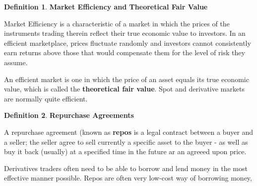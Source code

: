 \documentclass{book}
\theoremstyle{definition}
\newtheorem{definition}{Definition}[section]
\theoremstyle{remark}
\begin{document}
    \begin{definition}{\textbf{Market Efficiency and Theoretical Fair Value}}
        
        Market Efficiency is a characteristic of a market in which the prices of the instruments trading therein reflect their true economic value to investors. In an efficient marketplace, prices fluctuate randomly and investors cannot consistently earn returns above those that would compensate them for the level of risk they assume.
        
        An efficient market is one in which the price of an asset equals its true economic value, which is called the \textbf{theoretical fair value}. Spot and derivative markets are normally quite efficient. 
    \end{definition}
    
    \begin{definition}{\textbf{Repurchase Agreements}}
        
        A repurchase agreement (known as \textbf{repos} is a legal contract between a buyer and a seller; the seller agree to sell currently a specific asset to the buyer - as well as buy it back (usually) at a specified time in the future ar an agreeed upon price. 
        
        Derivatives traders often need to be able to borrow and lend money in the most effective manner possible. Repos are often very low-cost way of borrowing money, 
    \end{definition}
    
\end{document}
